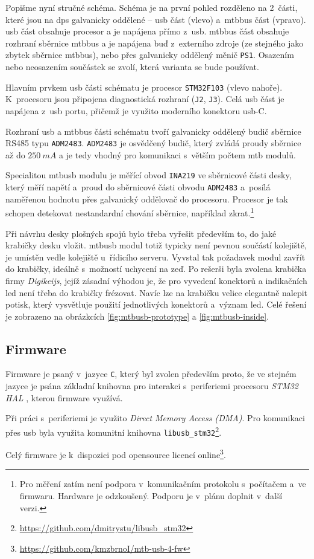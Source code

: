 Popišme nyní stručné schéma. Schéma je na první pohled rozděleno na 2~části,
které jsou na \gls{dps} galvanicky oddělené –
\gls{usb} část (vlevo) a~\gls{mtbbus} část (vpravo). \gls{usb} část obsahuje
procesor a je napájena přímo z~\gls{usb}. \gls{mtbbus} část obsahuje rozhraní
sběrnice \gls{mtbbus} a je napájena buď z~externího zdroje (ze stejného jako
zbytek sběrnice \gls{mtbbus}), nebo přes galvanicky oddělený měnič \texttt{PS1}.
Osazením nebo neosazením součástek se zvolí, která varianta se bude používat.

Hlavním prvkem \gls{usb} části schématu je procesor
\texttt{STM32F103} (vlevo nahoře). K~procesoru jsou připojena diagnostická
rozhraní (\texttt{J2}, \texttt{J3}). Celá \gls{usb} část je napájena z~\gls{usb}
portu, přičemž je využito moderního konektoru \gls{usb}-C.

Rozhraní \gls{usb} a \gls{mtbbus} části schématu tvoří galvanicky oddělený
budič sběrnice RS485 typu \texttt{ADM2483}. \texttt{ADM2483} je osvědčený budič,
který zvládá proudy sběrnice až do $250~mA$ \cite{adm2483-datasheet} a je tedy
vhodný pro komunikaci s~větším počtem \gls{mtb} modulů.

Specialitou \gls{mtbusb} modulu je měřící obvod \texttt{INA219} ve sběrnicové
části desky, který měří napětí a~proud do sběrnicové části obvodu
\texttt{ADM2483} a~posílá naměřenou hodnotu přes galvanický oddělovač do
procesoru. Procesor je tak schopen detekovat nestandardní chování sběrnice,
například zkrat.\footnote{Pro měření zatím není podpora v~komunikačním
protokolu s~počítačem a~ve firmwaru. Hardware je odzkoušený. Podporu je v~plánu
doplnit v~další verzi.}

Při návrhu desky plošných spojů bylo třeba vyřešit především to, do jaké
krabičky desku vložit. \gls{mtbusb} modul totiž typicky není pevnou součástí
kolejiště, je umístěn vedle kolejiště u~řídicího serveru. Vyvstal tak požadavek
modul zavřít do krabičky, ideálně s~možností uchycení na zeď. Po rešerši byla
zvolena krabička firmy \textit{Digikeijs}, jejíž zásadní výhodou je, že pro
vyvedení konektorů a indikačních \gls{led} není třeba do krabičky frézovat. Navíc lze
na krabičku velice elegantně nalepit potisk, který vysvětluje použití
jednotlivých konektorů a~význam \gls{led}. Celé řešení je zobrazeno na
obrázkcích \ref{fig:mtbusb-prototype} a \ref{fig:mtbusb-inside}.


\subsection{Firmware}

Firmware je psaný v~jazyce \texttt{C}, který byl zvolen především proto, že ve
stejném jazyce je psána základní knihovna pro interakci s~periferiemi procesoru
\textit{STM32 HAL} \cite{stm32-hal}, kterou firmware využívá.

Při práci s~periferiemi je využito \textit{Direct Memory Access (DMA)}. Pro
komunikaci přes \gls{usb} byla využita komunitní knihovna
\texttt{libusb\_stm32}\footnote{\url{https://github.com/dmitrystu/libusb_stm32}}.

Celý firmware je k~dispozici pod opensource licencí
online\footnote{\url{https://github.com/kmzbrnoI/mtb-usb-4-fw}}.

